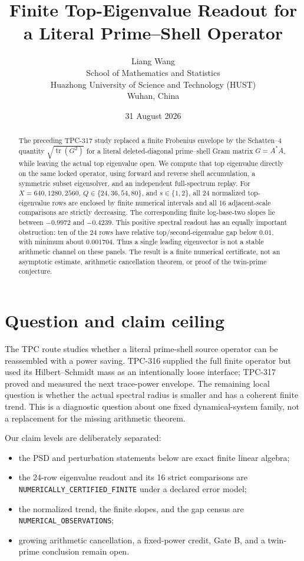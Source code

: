 \documentclass[10pt]{article}
\title{Finite Top-Eigenvalue Readout for a Literal Prime--Shell Operator}
\author{Liang Wang\\
  School of Mathematics and Statistics\\
  Huazhong University of Science and Technology (HUST)\\
  Wuhan, China}
\date{31 August 2026}
\newcommand{\tr}{\operatorname{tr}}
\begin{document}
\maketitle

\begin{abstract}
The preceding TPC-317 study replaced a finite Frobenius envelope by the
Schatten--4 quantity $\sqrt{\tr(G^2)}$ for a literal deleted-diagonal
prime--shell Gram matrix $G=A^*A$, while leaving the actual top eigenvalue
open.  We compute that top eigenvalue directly on the same locked operator,
using forward and reverse shell accumulation, a symmetric subset eigensolver,
and an independent full-spectrum replay.  For $X=640,1280,2560$,
$Q\in\{24,36,54,80\}$, and $s\in\{1,2\}$, all 24 normalized top-eigenvalue
rows are enclosed by finite numerical intervals and all 16 adjacent-scale
comparisons are strictly decreasing.  The corresponding finite log-base-two
slopes lie between $-0.9972$ and $-0.4239$.  This positive spectral readout has
an equally important obstruction: ten of the 24 rows have relative
top/second-eigenvalue gap below $0.01$, with minimum about $0.001704$.  Thus a
single leading eigenvector is not a stable arithmetic channel on these panels.
The result is a finite numerical certificate, not an asymptotic estimate,
arithmetic cancellation theorem, or proof of the twin-prime conjecture.
\end{abstract}

\section{Question and claim ceiling}

The TPC route studies whether a literal prime-shell source operator can be
reassembled with a power saving.  TPC-316 supplied the full finite operator but
used its Hilbert--Schmidt mass as an intentionally loose interface; TPC-317
proved and measured the next trace-power envelope.  The remaining local
question is whether the actual spectral radius is smaller and has a coherent
finite trend.  This is a diagnostic question about one fixed dynamical-system
family, not a replacement for the missing arithmetic theorem.

Our claim levels are deliberately separated:
\begin{itemize}
\item the PSD and perturbation statements below are exact finite linear algebra;
\item the 24-row eigenvalue readout and its 16 strict comparisons are
  \texttt{NUMERICALLY\_CERTIFIED\_FINITE} under a declared error model;
\item the normalized trend, the finite slopes, and the gap census are
  \texttt{NUMERICAL\_OBSERVATIONS};
\item growing arithmetic cancellation, a fixed-power credit, Gate B, and a
  twin-prime conclusion remain open.
\end{itemize}
\end{document}
